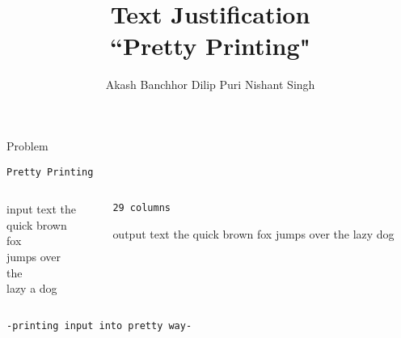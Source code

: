 \documentclass[11pt]{beamer}
\author[ACC]{Akash Banchhor \hspace*{.5cm} Dilip Puri \hspace*{.5cm} Nishant Singh}
\title{Text Justification\\``Pretty Printing"}
\institute[SVNIT]{Sardar Vallabhbhai National Institute of Technology, Surat}
\begin{document}
\begin{frame}
\titlepage
\end{frame}


\begin{frame}{Problem}

\centering \texttt{Pretty Printing}
\begin{columns}
\pause
\begin{column}{3cm}
\begin{block}{input text}
the\\
quick brown\\
fox\\
jumps over\\
the\\
lazy a dog
\end{block}
\end{column}
\begin{column}{5cm}
\pause
\begin{center}
 \texttt{29 columns}
\end{center}
\pause
\begin{exampleblock}{output text}
the quick brown fox jumps over the lazy dog
\end{exampleblock}
\end{column}
\end{columns}
\pause
\begin{center}
 \texttt{-printing input into pretty way-}
\end{center}
\end{frame}
\end{document}
